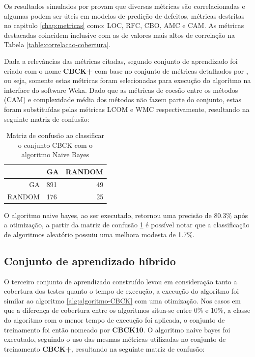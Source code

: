 \documentclass[
	12pt,				%
	oneside,			%
	a4paper,			%
	english,			%
	brazil				%
	]{abntex2ppgsi}
\begin{document}
Os resultados simulados por \cite{Xia2013} provam que diversas métricas são correlacionadas e algumas podem ser úteis em modelos de predição de defeitos, métricas destritas no capitulo \ref{chap:metricas}  como: LOC, RFC, CBO, AMC e CAM.  As métricas destacadas coincidem inclusive com as de valores mais altos de correlação na Tabela \ref{table:correlacao-cobertura}.

Dada a relevâncias das métricas citadas, segundo conjunto de aprendizado foi criado com o nome \textbf{CBCK+} com base no conjunto de métricas detalhados por \cite{Xia2013}, ou seja, somente estas métricas foram selecionadas para execução do algorítmo na interface do software Weka. Dado que as métricas de coesão entre os métodos (CAM) e complexidade média dos métodos não fazem parte do conjunto, estas foram substituídas pelas métricas LCOM e WMC respectivamente, resultando na seguinte matriz de confusão:

\begin{table}[h]
\centering
\caption{Matriz de confusão ao classificar o conjunto CBCK com o algoritmo Naive Bayes}
\vspace{0.5cm}
\begin{tabular}{r|lr}

										
 & GA & RANDOM \\ %
\hline                               %
GA		& 891		& 49 \\
RANDOM		& 176		& 25
\end{tabular}
\label{table:confusao-CBCK+}
\end{table}

O algoritmo naive bayes, ao ser executado, retornou uma precisão de 80.3\% após a otimização, a partir da matriz de confusão \ref{table:confusao-CBCK+} é possível notar que a classificação de algoritmos aleatório possuiu uma melhora modesta de 1.7\%. 

\subsection{Conjunto de aprendizado híbrido}

O terceiro conjunto de aprendizado construído levou em consideração tanto a cobertura dos testes quanto o tempo de execução, a execução do algoritmo foi similar ao algoritmo \ref{alg:algoritmo-CBCK} com uma otimização. Nos casos em que a diferença de cobertura entre os algoritmos situa-se entre 0\% e 10\%, a classe do algoritmo com o menor tempo de execução foi aplicada, o conjunto de treinamento foi então nomeado por \textbf{CBCK10}. O algoritmo naive bayes foi executado, seguindo o uso das mesmas métricas utilizadas no conjunto de treinamento \textbf{CBCK+}, resultando na seguinte matriz de confusão:
\end{document}
